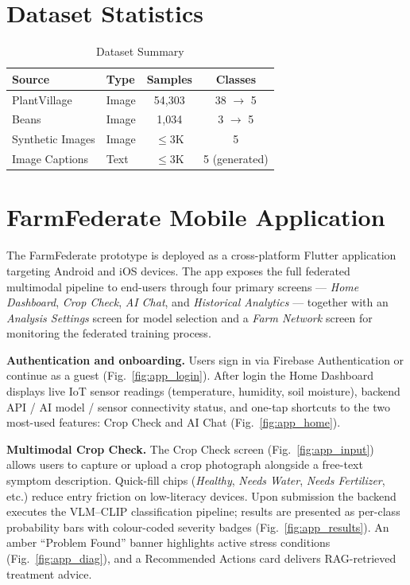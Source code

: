 \documentclass[conference]{IEEEtran}
\begin{document}
\section{Dataset Statistics}
\begin{table}[!h]
\caption{Dataset Summary}
\label{tab:datasets}
\centering\footnotesize
\begin{tabular}{lp{1cm}cc}
\toprule
\textbf{Source} & \textbf{Type} & \textbf{Samples} & \textbf{Classes}\\
\midrule
PlantVillage     & Image  & 54,303   & 38 $\to$ 5 \\
Beans            & Image  & 1,034    & 3 $\to$ 5 \\
Synthetic Images & Image  & $\le$3K  & 5 \\
Image Captions   & Text   & $\le$3K  & 5 (generated) \\
\bottomrule
\end{tabular}
\end{table}

\section{FarmFederate Mobile Application}
\label{app:screenshots}

The FarmFederate prototype is deployed as a cross-platform Flutter application
targeting Android and iOS devices.  The app exposes the full federated
multimodal pipeline to end-users through four primary screens — \emph{Home
Dashboard}, \emph{Crop Check}, \emph{AI Chat}, and \emph{Historical Analytics}
— together with an \emph{Analysis Settings} screen for model selection and a
\emph{Farm Network} screen for monitoring the federated training process.

\textbf{Authentication and onboarding.}
Users sign in via Firebase Authentication or continue as a guest
(Fig.~\ref{fig:app_login}).  After login the Home Dashboard displays live IoT
sensor readings (temperature, humidity, soil moisture), backend API / AI model
/ sensor connectivity status, and one-tap shortcuts to the two most-used
features: Crop Check and AI Chat (Fig.~\ref{fig:app_home}).

\textbf{Multimodal Crop Check.}
The Crop Check screen (Fig.~\ref{fig:app_input}) allows users to capture or
upload a crop photograph alongside a free-text symptom description.  Quick-fill
chips (\emph{Healthy}, \emph{Needs Water}, \emph{Needs Fertilizer}, etc.)
reduce entry friction on low-literacy devices.  Upon submission the backend
executes the VLM--CLIP classification pipeline; results are presented as
per-class probability bars with colour-coded severity badges
(Fig.~\ref{fig:app_results}).  An amber ``Problem Found'' banner highlights
active stress conditions (Fig.~\ref{fig:app_diag}), and a Recommended Actions
card delivers RAG-retrieved treatment advice.
\end{document}
